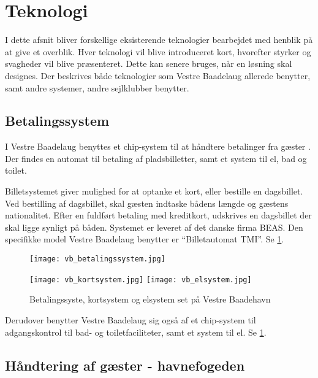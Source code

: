 \section{Teknologi} %
\label{sec:Teknologi}

I dette afsnit bliver forskellige eksisterende teknologier bearbejdet med henblik på at give et overblik. Hver teknologi vil blive introduceret kort, hvorefter styrker og svagheder vil blive præsenteret. Dette kan senere bruges, når en løsning skal designes. Der beskrives både teknologier som Vestre Baadelaug allerede benytter, samt andre systemer, andre sejlklubber benytter. 

\subsection{Betalingssystem} %
\label{sub:tek_betaling}

I Vestre Baadelaug benyttes et chip-system til at håndtere betalinger fra gæster \cite{int_hf}. Der findes en automat til betaling af pladsbilletter, samt et system til el, bad og toilet.

Billetsystemet giver mulighed for at optanke et kort, eller bestille en dagsbillet. Ved bestilling af dagsbillet, skal gæsten indtaske bådens længde og gæstens nationalitet. Efter en fuldført betaling med kreditkort, udskrives en dagsbillet der skal ligge synligt på båden. Systemet er leveret af det danske firma BEAS. Den specifikke model Vestre Baadelaug benytter er \enquote{Billetautomat TMI}. Se \cref{fig:vb_systemer}.

\begin{figure}[h]
  \centering
  \begin{minipage}{0.45\textwidth}
    \texttt{[image: vb\_betalingssystem.jpg]}
  \end{minipage}
  \begin{minipage}{0.45\textwidth}
    \texttt{[image: vb\_kortsystem.jpg]}
    \texttt{[image: vb\_elsystem.jpg]}
  \end{minipage}
    \caption{Betalingssyste, kortsystem og elsystem set på Vestre Baadehavn}
    \label{fig:vb_systemer}
\end{figure}

Derudover benytter Vestre Baadelaug sig også af et chip-system til adgangskontrol til bad- og toiletfaciliteter, samt et system til el. Se \cref{fig:vb_systemer}.

\subsection{Håndtering af gæster - havnefogeden} %
\label{sub:gaster_havnefogeden}

